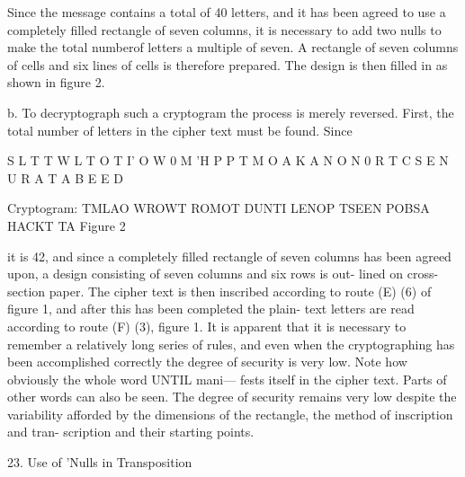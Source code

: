 Since the message contains a total of 40 letters, and it has been
agreed to use a completely ﬁlled rectangle of seven columns, it is
necessary to add two nulls to make the total numberof letters a
multiple of seven. A rectangle of seven columns of cells and six
lines of cells is therefore prepared. The design is then ﬁlled in as
shown in ﬁgure 2.

b. To decryptograph such a cryptogram the process is merely reversed.
First, the total number of letters in the cipher text must be found. Since

 

 

 

 

 

 

 

 

 

 

 

 

 

 

S L T T W L T
O T I' O W 0 M
'H P P T M O A
K A N O N 0 R
T C S E N U R
A T A B E E D

 

Cryptogram:
TMLAO WROWT ROMOT DUNTI LENOP
TSEEN POBSA HACKT TA
Figure 2


it is 42, and since a completely ﬁlled rectangle of seven columns has been
agreed upon, a design consisting of seven columns and six rows is out-
lined on cross-section paper. The cipher text is then inscribed according
to route (E) (6) of ﬁgure 1, and after this has been completed the plain-
text letters are read according to route (F) (3), ﬁgure 1. It is apparent
that it is necessary to remember a relatively long series of rules, and even
when the cryptographing has been accomplished correctly the degree of
security is very low. Note how obviously the whole word UNTIL mani—
fests itself in the cipher text. Parts of other words can also be seen.
The degree of security remains very low despite the variability afforded
by the dimensions of the rectangle, the method of inscription and tran-
scription and their starting points.

23. Use of 'Nulls in Transposition

